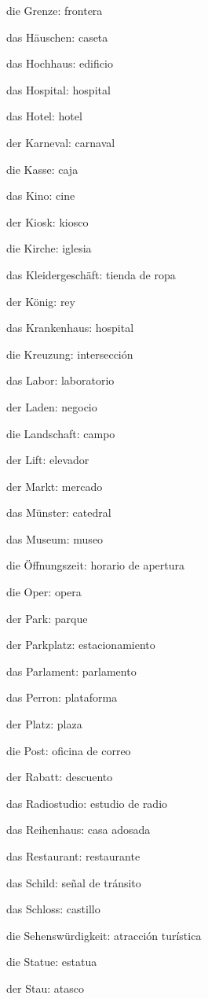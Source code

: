 \begin{multicols}{2}
\begin{myitemize}
\item die Grenze: frontera
\item das Häuschen: caseta
\item das Hochhaus: edificio
\item das Hospital: hospital
\item das Hotel: hotel
\item der Karneval: carnaval
\item die Kasse: caja
\item das Kino: cine
\item der Kiosk: kiosco
\item die Kirche: iglesia
\item das Kleidergeschäft: tienda de ropa
\item der König: rey
\item das Krankenhaus: hospital
\item die Kreuzung: intersección
\item das Labor: laboratorio
\item der Laden: negocio
\item die Landschaft: campo
\item der Lift: elevador
\item der Markt: mercado
\item das Münster: catedral
\item das Museum: museo
\item die Öffnungszeit: horario de apertura
\item die Oper: opera
\item der Park: parque
\item der Parkplatz: estacionamiento
\item das Parlament: parlamento
\item das Perron: plataforma
\item der Platz: plaza
\item die Post: oficina de correo
\item der Rabatt: descuento
\item das Radiostudio: estudio de radio
\item das Reihenhaus: casa adosada
\item das Restaurant: restaurante
\item das Schild: señal de tránsito
\item das Schloss: castillo
\item die Sehenswürdigkeit: atracción turística
\item die Statue: estatua
\item der Stau: atasco

\end{myitemize}
\end{multicols}
